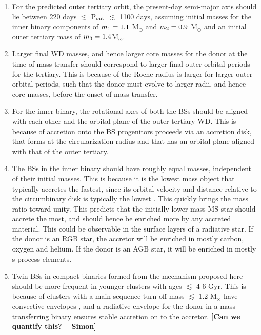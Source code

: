 \documentclass{aastex62}
\def\simon#1{{\bf {\color{red}[#1 -- Simon]}}}
\begin{document}
\begin{enumerate}

\item For the predicted outer tertiary orbit, the present-day
  semi-major axis should lie between 220 days $\lesssim$ P$_{\rm out}$
  $\lesssim$ 1100 days, assuming initial masses for the inner binary
  components of $m_{\rm 1} = 1.1$ M$_{\odot}$ and $m_{\rm 2} = 0.9$
  M$_{\odot}$ and an initial outer tertiary mass of $m_{\rm 3} = 1.4
  $M$_{\odot}$.

\item Larger final WD masses, and hence larger core masses for the donor at
  the time of mass transfer should correspond to larger final outer
  orbital periods for the tertiary.  This is because of the Roche radius
  is larger for larger outer orbital periods, such that the donor must
  evolve to larger radii, and hence core masses, before the onset of
  mass transfer.

\item For the inner binary, the rotational axes of both the BSs should
  be aligned with each other and the orbital plane of the outer
  tertiary WD.  This is because of accretion onto the BS progenitors
  proceeds via an accretion disk, that forms at the circularization
  radius and that has an orbital plane aligned with that of the outer
  tertiary.

\item The BSs in the inner binary should have roughly equal masses,
  independent of their initial masses.  This is because it is the
  lowest mass object that typically accretes the fastest, since its
  orbital velocity and distance relative to the circumbinary disk is
  typically the lowest
  \citep[e.g.][]{1995MNRAS.277.1491K,1997MNRAS.285...33B,2000MNRAS.314...33B}.
  This quickly brings the mass ratio toward unity.  This predicts that
  the initially lower mass MS star should accrete the most, and should
  hence be enriched more by any accreted material.  This could be
  observable in the surface layers of a radiative star.  If the donor
  is an RGB star, the accretor will be enriched in mostly carbon,
  oxygen and helium.  If the donor is an AGB star, it will be enriched
  in mostly s-process elements.

\item Twin BSs in compact binaries formed from the mechanism proposed here 
  should be more frequent in younger clusters with ages $\lesssim$ 4-6
  Gyr.  This is because of clusters with a main-sequence turn-off mass
  $\lesssim$ 1.2 M$_{\odot}$ have convective envelopes
  \citep[e.g.][]{1991ApJS...76...55I,2009pfer.book.....M}, and a radiative envelope for the
  donor in a mass transferring binary ensures stable accretion on to
  the accretor.  \simon{Can we quantify this?}

\end{enumerate}
\end{document}
